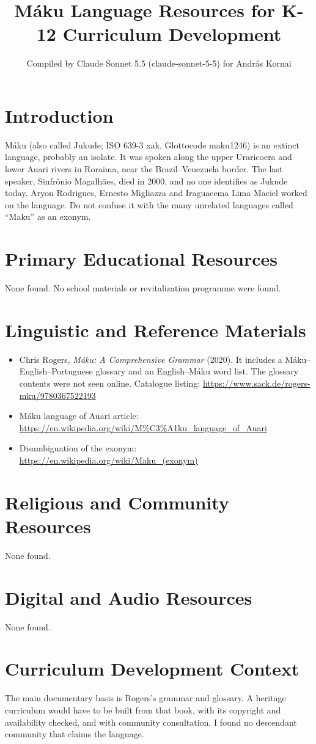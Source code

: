 \documentclass[12pt]{article}
\title{M\'aku Language Resources for K-12 Curriculum Development}
\author{Compiled by Claude Sonnet 5.5 (claude-sonnet-5-5) for Andr\'as Kornai}
\date{}
\begin{document}
\maketitle

\section{Introduction}
M\'aku (also called Jukude; ISO 639-3 xak, Glottocode maku1246) is an extinct language, probably an isolate. It was spoken along the upper Uraricoera and lower Auari rivers in Roraima, near the Brazil--Venezuela border. The last speaker, Sinfr\^onio Magalh\~aes, died in 2000, and no one identifies as Jukude today. Aryon Rodrigues, Ernesto Migliazza and Iraguacema Lima Maciel worked on the language. Do not confuse it with the many unrelated languages called ``Maku'' as an exonym.

\section{Primary Educational Resources}
None found. No school materials or revitalization programme were found.

\section{Linguistic and Reference Materials}
\begin{itemize}
\item Chris Rogers, \emph{M\'aku: A Comprehensive Grammar} (2020). It includes a M\'aku--English--Portuguese glossary and an English--M\'aku word list. The glossary contents were not seen online. Catalogue listing: \url{https://www.sack.de/rogers-mku/9780367522193}
\item M\'aku language of Auari article: \url{https://en.wikipedia.org/wiki/M%C3%A1ku_language_of_Auari}
\item Disambiguation of the exonym: \url{https://en.wikipedia.org/wiki/Maku_(exonym)}
\end{itemize}

\section{Religious and Community Resources}
None found.

\section{Digital and Audio Resources}
None found.

\section{Curriculum Development Context}
The main documentary basis is Rogers's grammar and glossary. A heritage curriculum would have to be built from that book, with its copyright and availability checked, and with community consultation. I found no descendant community that claims the language.
\end{document}
